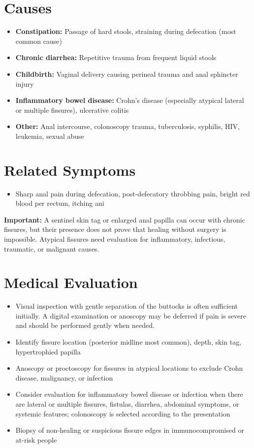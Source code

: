 \section*{Causes}
\begin{itemize}
 \item \textbf{Constipation:} Passage of hard stools, straining during defecation (most common cause)
 \item \textbf{Chronic diarrhea:} Repetitive trauma from frequent liquid stools
 \item \textbf{Childbirth:} Vaginal delivery causing perineal trauma and anal sphincter injury
 \item \textbf{Inflammatory bowel disease:} Crohn's disease (especially atypical lateral or multiple fissures), ulcerative colitis
 \item \textbf{Other:} Anal intercourse, colonoscopy trauma, tuberculosis, syphilis, HIV, leukemia, sexual abuse
\end{itemize}

\section*{Related Symptoms}
\begin{itemize}
 \item Sharp anal pain during defecation, post-defecatory throbbing pain, bright red blood per rectum, itching ani
\end{itemize}
\textbf{Important:} A sentinel skin tag or enlarged anal papilla can occur with chronic fissures, but their presence does not prove that healing without surgery is impossible. Atypical fissures need evaluation for inflammatory, infectious, traumatic, or malignant causes.

\section*{Medical Evaluation}
\begin{itemize}
 \item Visual inspection with gentle separation of the buttocks is often sufficient initially. A digital examination or anoscopy may be deferred if pain is severe and should be performed gently when needed.
 \item Identify fissure location (posterior midline most common), depth, skin tag, hypertrophied papilla
 \item Anoscopy or proctoscopy for fissures in atypical locations to exclude Crohn disease, malignancy, or infection
 \item Consider evaluation for inflammatory bowel disease or infection when there are lateral or multiple fissures, fistulas, diarrhea, abdominal symptoms, or systemic features; colonoscopy is selected according to the presentation
 \item Biopsy of non-healing or suspicious fissure edges in immunocompromised or at-risk people
\end{itemize}

